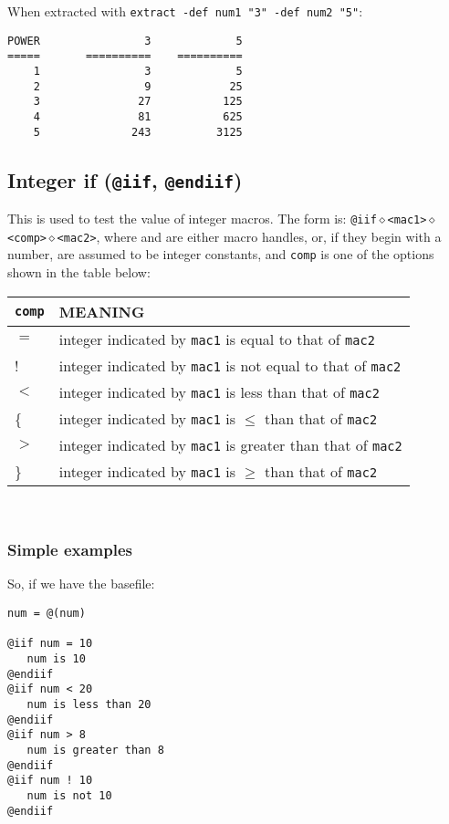 \noindent
When extracted with {\tt extract -def num1 "3" -def num2 "5"}:
\begin{verbatim}
POWER                3             5
=====       ==========    ==========
    1                3             5
    2                9            25
    3               27           125
    4               81           625
    5              243          3125
\end{verbatim}

\subsection{Integer if ({\tt @iif}, {\tt @endiif})}
This is used to test the value of integer macros.  The form is:
{\tt @iif$\diamond$<mac1>$\diamond$<comp>$\diamond$<mac2>}, where
{\tt <mac1>} and {\tt <mac2>} are either macro handles, or, if they
begin with a number, are assumed to be integer constants,
and {\tt comp} is one of the options shown in the table below:\\
\begin{tabular}{|l|l|}\hline
{\tt comp} & MEANING\\\hline
$=$   & integer indicated by {\tt mac1} is equal to that of {\tt mac2}\\\hline
!     & integer indicated by {\tt mac1} is not equal to that of {\tt mac2}\\\hline
$<$ & integer indicated by {\tt mac1} is less than that of {\tt mac2}\\\hline
\{   & integer indicated by {\tt mac1} is $\le$ than that of {\tt mac2}\\\hline
$>$ & integer indicated by {\tt mac1} is greater than that of {\tt mac2}\\\hline
\}   & integer indicated by {\tt mac1} is $\ge$ than that of {\tt mac2}\\\hline
\end{tabular} \\

\subsubsection{Simple examples}
So, if we have the basefile:
\begin{verbatim}
num = @(num)

@iif num = 10
   num is 10
@endiif
@iif num < 20
   num is less than 20
@endiif
@iif num > 8
   num is greater than 8
@endiif
@iif num ! 10
   num is not 10
@endiif
\end{verbatim}

